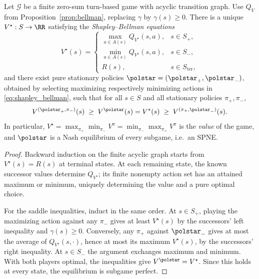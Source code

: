\begin{theoremenv}\label{thm:shapley_bellman}
Let $\mathcal{G}$ be a finite zero-sum turn-based game with acyclic transition graph. Use $Q_V$ from Proposition~\ref{prop:bellman}, replacing $\gamma$ by $\gamma(s)\ge0$. There is a unique $V^{\star}:S\to\RR$ satisfying the \emph{Shapley--Bellman equations}
\begin{equation}
V^{\star}(s)=
\begin{cases}
\max_{a\in A(s)}Q_{V^{\star}}(s,a),&s\in S_+,\\
\min_{a\in A(s)}Q_{V^{\star}}(s,a),&s\in S_-,\\
R(s),&s\in S_{\mathrm{ter}},
\end{cases}
\label{eq:shapley_bellman}
\end{equation}
and there exist pure stationary policies $\polstar = (\polstar_{+}, \polstar_{-})$, obtained by selecting maximizing respectively minimizing actions in \eqref{eq:shapley_bellman}, such that for all $s \in S$ and all stationary policies $\pi_{+}, \pi_{-}$,
\begin{equation}
	V^{(\polstar_{+}, \pi_{-})}(s) \;\ge\; V^{\polstar}(s) = V^{\star}(s) \;\ge\; V^{(\pi_{+}, \polstar_{-})}(s).
	\label{eq:saddle_point}
\end{equation}
In particular, $V^{\star}=\max_{\pi_+}\min_{\pi_-}V^{\pi}=\min_{\pi_-}\max_{\pi_+}V^{\pi}$ is the \emph{value} of the game, and $\polstar$ is a Nash equilibrium of every subgame, i.e.\ an SPNE.\end{theoremenv}

\begin{proof}
Backward induction on the finite acyclic graph starts from $V^{\star}(s)=R(s)$ at terminal states. At each remaining state, the known successor values determine $Q_{V^{\star}}$; its finite nonempty action set has an attained maximum or minimum, uniquely determining the value and a pure optimal choice.

For the saddle inequalities, induct in the same order. At $s\in S_+$, playing the maximizing action against any $\pi_-$ gives at least $V^{\star}(s)$ by the successors' left inequality and $\gamma(s)\ge0$. Conversely, any $\pi_+$ against $\polstar_-$ gives at most the average of $Q_{V^{\star}}(s,\cdot)$, hence at most its maximum $V^{\star}(s)$, by the successors' right inequality. At $s\in S_-$ the argument exchanges maximum and minimum. With both players optimal, the inequalities give $V^{\polstar}=V^{\star}$. Since this holds at every state, the equilibrium is subgame perfect.
\end{proof}


